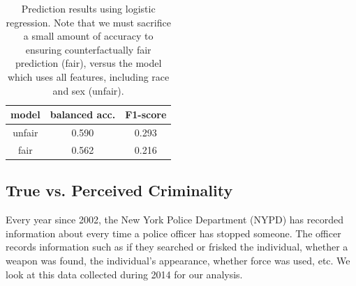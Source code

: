 \begin{table}[t]
\vspace{-2ex}
\caption{Prediction results using logistic regression. Note that we must sacrifice a small amount of accuracy to ensuring counterfactually fair prediction (fair), versus the model which uses all features, including race and sex (unfair).}
\vspace{-3ex}
\label{table.pred_law}
\begin{center}
\resizebox{\columnwidth}{!}
{
\begin{sc}
\footnotesize
\begin{tabular}{c|c|c}
\hline
\hline
model & balanced acc. & F1-score  \\
\hline
unfair & 0.590 & 0.293 \\ \hline
fair  &  0.562 & 0.216 \\
\hline
\end{tabular}
\end{sc}
}
\end{center}
\vspace{-4ex}
\end{table}


\subsection{True vs. Perceived Criminality}
\label{sec:true-vs.-perceived}
Every year since 2002, the New York Police Department (NYPD) has recorded information about every time a police officer has stopped someone. The officer records information such as if they searched or frisked the individual, whether a weapon was found, the individual's appearance, whether force was used, etc. We look at this data collected during 2014 for our analysis.


